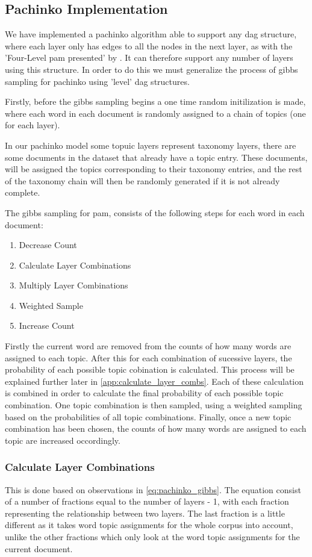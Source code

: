 \subsection{Pachinko Implementation}
We have implemented a pachinko algorithm able to support any \gls{dag} structure, where each layer only has edges to all the nodes in the next layer, as with the 'Four-Level \gls{pam} presented' by \citet{li2006pachinko}.
It can therefore support any number of layers using this structure.
In order to do this we must generalize the process of gibbs sampling for pachinko using 'level' \gls{dag} structures.

Firstly, before the gibbs sampling begins a one time random initilization is made, where each word in each document is randomly assigned to a chain of topics (one for each layer).

In our pachinko model some topuic layers represent taxonomy layers, there are some documents in the dataset that already have a topic entry.
These documents, will be assigned the topics corresponding to their taxonomy entries, and the rest of the taxonomy chain will then be randomly generated if it is not already complete.

The gibbs sampling for \gls{pam}, consists of the following steps for each word in each document:

\begin{enumerate}
	\item Decrease Count
	\item Calculate Layer Combinations
	\item Multiply Layer Combinations
	\item Weighted Sample
	\item Increase Count
\end{enumerate}

Firstly the current word are removed from the counts of how many words are assigned to each topic.
After this for each combination of sucessive layers, the probability of each possible topic cobination is calculated.
This process will be explained further later in \autoref{app:calculate_layer_combs}.
Each of these calculation is combined in order to calculate the final probability of each possible topic combination.
One topic combination is then sampled, using a weighted sampling based on the probabilities of all topic combinations.
Finally, once a new topic combination has been chosen, the counts of how many words are assigned to each topic are increased occordingly.

\subsubsection{Calculate Layer Combinations}\label{app:calculate_layer_combs}
This is done based on observations in \autoref{eq:pachinko_gibbs}.
The equation consist of a number of fractions equal to the number of layers - 1, with each fraction representing the relationship between two layers.
The last fraction is a little different as it takes word topic assignments for the whole corpus into account, unlike the other fractions which only look at the word topic assignments for the current document.

